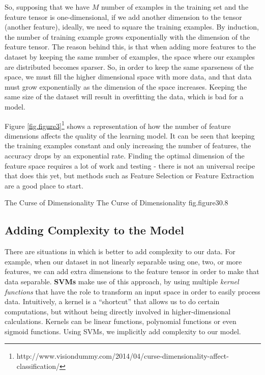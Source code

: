 So, supposing that we have $M$ number of examples in the training set and 
the feature tensor is one-dimensional, if we add another dimension to the 
tensor (another feature), ideally, we need to square the training examples. 
By induction, the number of training example grows exponentially with the 
dimension of the feature tensor. The reason behind this, is that when adding 
more features to the dataset by keeping the same number of examples, the 
space where our examples are distributed becomes sparser. So, in order to 
keep the same sparseness of the space, we must fill the higher dimensional 
space with more data, and that data must grow exponentially as the dimension 
of the space increases. Keeping the same size of the dataset will result in 
overfitting the data, which is bad for a model.

Figure \ref{fig.figure3}\footnote{http://www.visiondummy.com/2014/04/curse-dimensionality-affect-classification/} shows a representation of how the number of feature dimensions 
affects the quality of the learning model. It can be seen that keeping the 
training examples constant and only increasing the number of features, the 
accuracy drops by an exponential rate. Finding the optimal dimension of the 
feature space requires a lot of work and testing - there is not an universal 
recipe that does this yet, but methods such as Feature Selection or Feature 
Extraction are a good place to start. 

%
    {The Curse of Dimensionality}%
    {The Curse of Dimensionality}%
    {fig.figure3}{0.8}

\subsection{Adding Complexity to the Model}
\label{polyn}

There are situations in which is better to add complexity to our data. 
For example, when our dataset in not linearly separable using one, two, or more 
features, we can add extra dimensions to the feature tensor in order to make 
that data separable. {\bf SVMs} make use of this approach, by using multiple 
{\it kernel functions} that have the role to transform an input space in order 
to easily process data. Intuitively, a kernel is a ``shortcut'' that allows us 
to do certain computations, but without being directly involved in higher-dimensional 
calculations. Kernels can be linear functions, polynomial functions or even sigmoid 
functions. Using SVMs, we implicitly add complexity to our model.

